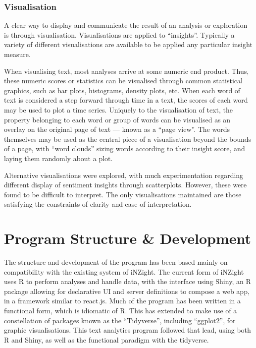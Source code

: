 \message{ !name(jason-cairns-dissertation.tex)}\documentclass[11pt, a4paper, titlepage]{report}
\begin{document}
\subsection{Visualisation}\label{sec:visualisation-1}

A clear way to display and communicate the result of an analysis or
exploration is through visualisation. Visualisations are applied to
``insights''. Typically a variety of different visualisations are
available to be applied any particular insight measure.

When visualising text, most analyses arrive at some numeric end
product. Thus, these numeric scores or statistics can be visualised
through common statistical graphics, such as bar plots, histograms,
density plots, etc. When each word of text is considered a step
forward through time in a text, the scores of each word may be used to
plot a time series. Uniquely to the visualisation of text, the
property belonging to each word or group of words can be visualised as
an overlay on the original page of text --- known as a ``page view''.
The words themselves may be used as the central piece of a
visualisation beyond the bounds of a page, with ``word clouds'' sizing
words according to their insight score, and laying them randomly about
a plot.

Alternative visualisations were explored, with much experimentation
regarding different display of sentiment insights through
scatterplots. However, these were found to be difficult to interpret.
The only visualisations maintained are those satisfying the
constraints of clarity and ease of interpretation.

\chapter{Program Structure \& Development}\label{cha:program-structure}

The structure and development of the program has been based mainly on
compatibility with the existing system of iNZight. The current form of
iNZight uses R to perform analyses and handle data, with the interface
using Shiny, an R package allowing for declarative UI and server
definitions to compose a web app, in a framework similar to
react.js\autocite{chang19}. Much of the program has been written in a
functional form, which is idiomatic of R. This has extended to make
use of a constellation of packages known as the
``Tidyverse''\autocite{wickham17tidy}, including
``ggplot2''\autocite{wickham16ggplt}, for graphic visualisations. This
text analytics program followed that lead, using both R and Shiny, as
well as the functional paradigm with the tidyverse.
\end{document}
